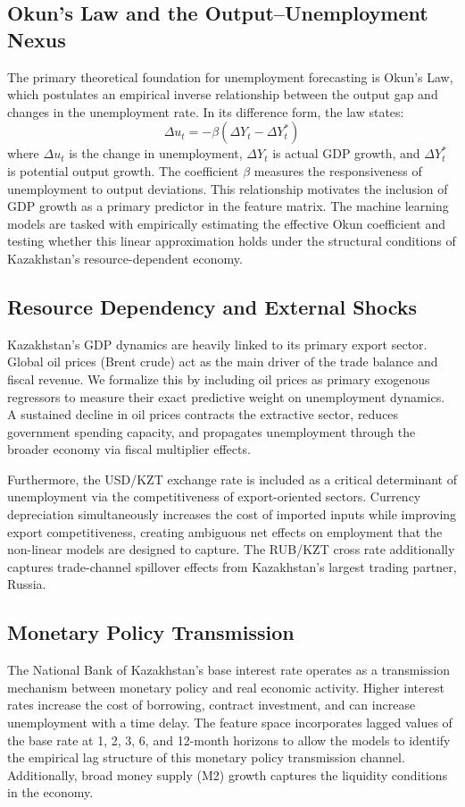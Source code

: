\documentclass[14pt, a4paper]{extarticle}
\begin{document}
\subsection{Okun's Law and the Output--Unemployment Nexus}
The primary theoretical foundation for unemployment forecasting is Okun's Law, which postulates an empirical inverse relationship between the output gap and changes in the unemployment rate. In its difference form, the law states:
\begin{equation}
    \Delta u_t = -\beta (\Delta Y_t - \Delta Y_t^*)
    \label{eq:okun}
\end{equation}
where $\Delta u_t$ is the change in unemployment, $\Delta Y_t$ is actual GDP growth, and $\Delta Y_t^*$ is potential output growth. The coefficient $\beta$ measures the responsiveness of unemployment to output deviations. This relationship motivates the inclusion of GDP growth as a primary predictor in the feature matrix. The machine learning models are tasked with empirically estimating the effective Okun coefficient and testing whether this linear approximation holds under the structural conditions of Kazakhstan's resource-dependent economy.

\subsection{Resource Dependency and External Shocks}
Kazakhstan's GDP dynamics are heavily linked to its primary export sector. Global oil prices (Brent crude) act as the main driver of the trade balance and fiscal revenue. We formalize this by including oil prices as primary exogenous regressors to measure their exact predictive weight on unemployment dynamics. A sustained decline in oil prices contracts the extractive sector, reduces government spending capacity, and propagates unemployment through the broader economy via fiscal multiplier effects.

Furthermore, the USD/KZT exchange rate is included as a critical determinant of unemployment via the competitiveness of export-oriented sectors. Currency depreciation simultaneously increases the cost of imported inputs while improving export competitiveness, creating ambiguous net effects on employment that the non-linear models are designed to capture. The RUB/KZT cross rate additionally captures trade-channel spillover effects from Kazakhstan's largest trading partner, Russia.

\subsection{Monetary Policy Transmission}
The National Bank of Kazakhstan's base interest rate operates as a transmission mechanism between monetary policy and real economic activity. Higher interest rates increase the cost of borrowing, contract investment, and can increase unemployment with a time delay. The feature space incorporates lagged values of the base rate at 1, 2, 3, 6, and 12-month horizons to allow the models to identify the empirical lag structure of this monetary policy transmission channel. Additionally, broad money supply (M2) growth captures the liquidity conditions in the economy.
\end{document}
